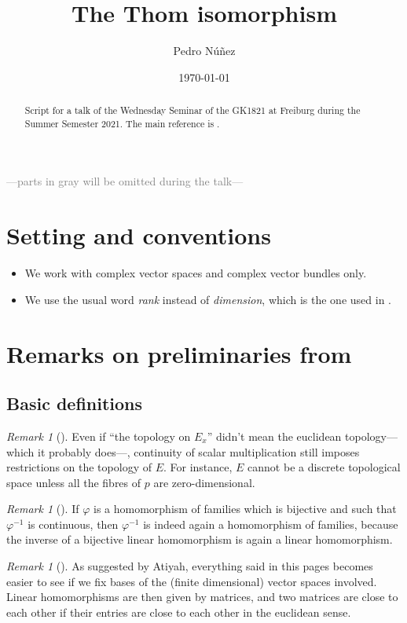 \documentclass[12pt,a4paper]{amsart}
\title[The Thom isomorphism]{The Thom isomorphism}
\author[Pedro N\'{u}\~{n}ez]{Pedro N\'{u}\~{n}ez}
\date{\today}
\theoremstyle{plain}
\theoremstyle{definition}
\theoremstyle{remark}
\newtheorem{rem}[thm]{Remark}
\begin{document}
\maketitle

\begin{abstract}
  Script for a talk of the Wednesday Seminar of the GK1821 at Freiburg during the Summer Semester 2021.
  The main reference is \cite[\S 2]{ati67}.
\end{abstract}

\tableofcontents

\begin{center}
  \textcolor{gray}{---parts in gray will be omitted during the talk---}
\end{center}

\section{Setting and conventions}

\begin{itemize}
  \item We work with complex vector spaces and complex vector bundles only.
  \item We use the usual word \textit{rank} instead of \textit{dimension}, which is the one used in \cite{ati67}.
\end{itemize}

\section{Remarks on preliminaries from \cite{ati67}}

\subsection{Basic definitions \cite[\S 1.1]{ati67}}

\begin{rem}[{\cite[p.~1]{ati67}}]
  Even if ``the topology on $E_{x}$'' didn't mean the euclidean topology---which it probably does---, continuity of scalar multiplication still imposes restrictions on the topology of $E$.
  For instance, $E$ cannot be a discrete topological space unless all the fibres of $p$ are zero-dimensional.
\end{rem}

\begin{rem}[{\cite[p.~2]{ati67}}]
  If $\varphi$ is a homomorphism of families which is bijective and such that $\varphi^{-1}$ is continuous, then $\varphi^{-1}$ is indeed again a homomorphism of families, because the inverse of a bijective linear homomorphism is again a linear homomorphism.
\end{rem}

\begin{rem}[{\cite[pp.~4--5]{ati67}}]
  As suggested by Atiyah, everything said in this pages becomes easier to see if we fix bases of the (finite dimensional) vector spaces involved.
  Linear homomorphisms are then given by matrices, and two matrices are close to each other if their entries are close to each other in the euclidean sense.
\end{rem}



\vfill
\end{document}
